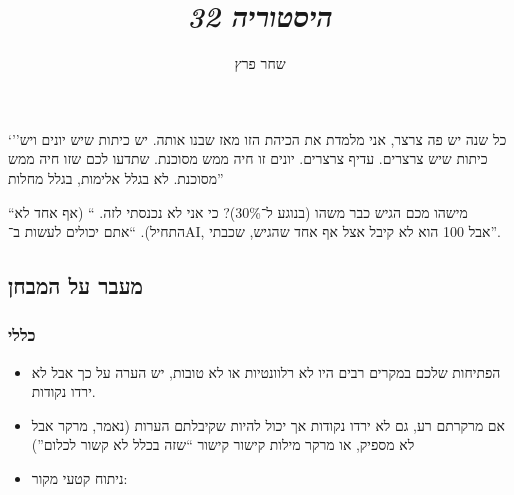 \documentclass[]{article}
\author{שחר פרץ}
\title{\textit{היסטוריה 32}}
\theoremstyle{definition}
\begin{document}
    \maketitle
    `''כל שנה יש פה צרצר, אני מלמדת את הכיהת הזו מאז שבנו אותה. יש כיתות שיש יונים ויש כיתות שיש צרצרים. עדיף צרצרים. יונים זו חיה ממש מסוכנת. שתדעו לכם שזו חיה ממש מסוכנת. לא בגלל אלימות, בגלל מחלות''
    
    ``מישהו מכם הגיש כבר משהו (בנוגע ל־30\%)? כי אני לא נכנסתי לזה. `` (אף אחד לא התחיל). ``אתם יכולים לעשות ב־AI, אבל 100 הוא לא קיבל אצל אף אחד שהגיש, שכבתי''. 
    
    \subsection*{מעבר על המבחן}
    \subsubsection*{כללי}
    \begin{itemize}
        \item הפתיחות שלכם במקרים רבים היו לא רלוונטיות או לא טובות, יש הערה על כך אבל לא ירדו נקודות. 
        \item אם מרקרתם רע, גם לא ירדו נקודות אך יכול להיות שקיבלתם הערות (נאמר, מרקר אבל לא מספיק, או מרקר מילות קישור קישור ``שזה בכלל לא קשור לכלום'')
        \item ניתוח קטעי מקור: 
    \end{itemize}
\end{document}
